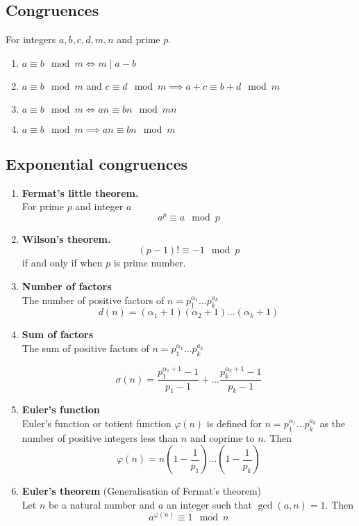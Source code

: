 \documentclass{article}
\begin{document}
  \subsection{Congruences}
    For integers $a,b,c,d,m,n$ and prime $p$.
    \begin{enumerate}
      \item
      $a \equiv b \mod m \iff m \mid a-b $
      \item
      $a\equiv b \mod m$ and $ c\equiv d \mod m \implies a+c\equiv b+d \mod m$
      \item
      $a \equiv b \mod m \iff an \equiv bn \mod mn$
      \item
      $a \equiv b \mod m \implies an \equiv bn \mod m$
    \end{enumerate}
  \subsection{Exponential congruences}
    \begin{enumerate}
    \item
    \textbf{Fermat's little theorem.} \\
    For prime $p$ and integer $a$
    $$a^p \equiv a \mod p$$

    \item
    \textbf{Wilson's theorem.} \\
    $$(p-1)! \equiv -1 \mod p$$
    if and only if when $p$ is prime number.

    \item
    \textbf{Number of factors} \\
    The number of positive factors of $n=p_1^{\alpha_1} \dots p_k^{a_k}$
    $$d(n)= (\alpha_1+1)(\alpha_2+1)\dots (\alpha_k+1)$$
    \item
    \textbf{Sum of factors} \\
    The sum of positive factors of $n=p_1^{\alpha_1} \dots p_k^{a_k}$

    $$\sigma(n)= \frac{p_1^{\alpha_1+1}-1}{p_1-1} + \dots \frac{p_k^{\alpha_k+1}-1}{p_k-1}$$

    \item
    \textbf{Euler's function} \\
    Euler’s function or totient function $\varphi(n)$ is defined for $n=p_1^{\alpha_1} \dots p_k^{a_k}$ as the number
    of positive integers less than $n$ and coprime to $n$. Then
    $$\varphi(n) = n \left(1-\frac{1}{p_1}\right) \dots  \left(1-\frac{1}{p_k}\right)$$

    \item
    \textbf{Euler's theorem}  (Generalisation of Fermat's theorem)\\
    Let $n$ be a natural number and $a$ an integer such that $\gcd(a,n)=1$. Then
    $$a^{\varphi(n)} \equiv 1 \mod n $$
    \end{enumerate}
\newpage
\end{document}
